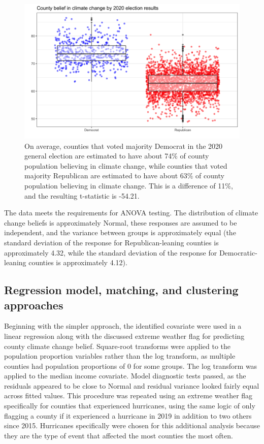 \documentclass{article}
\begin{document}
\begin{figure}[H]
\centering
\includegraphics[scale=0.2]{images/election_party_anova.png}
\caption{On average, counties that voted majority Democrat in the 2020 general election are estimated to have about 74\% of county population believing in climate change, while counties that voted majority Republican are estimated to have about 63\% of county population believing in climate change. This is a difference of 11\%, and the resulting t-statistic is -54.21.}
\end{figure}

The data meets the requirements for ANOVA testing. The distribution of climate change beliefs is approximately Normal, these responses are assumed to be independent, and the variance between groups is approximately equal (the standard deviation of the response for Republican-leaning counties is approximately 4.32, while the standard deviation of the response for Democratic-leaning counties is approximately 4.12). 

\subsection{Regression model, matching, and clustering approaches}
Beginning with the simpler approach, the identified covariate were used in a linear regression along with the discussed extreme weather flag for predicting county climate change belief. Square-root transforms were applied to the population proportion variables rather than the log transform, as multiple counties had population proportions of 0 for some groups. The log transform was applied to the median income covariate. Model diagnostic tests passed, as the residuals appeared to be close to Normal and residual variance looked fairly equal across fitted values. This procedure was repeated using an extreme weather flag specifically for counties that experienced hurricanes, using the same logic of only flagging a county if it experienced a hurricane in 2019 in addition to two others since 2015. Hurricanes specifically were chosen for this additional analysis because they are the type of event that affected the most counties the most often. 
\end{document}
